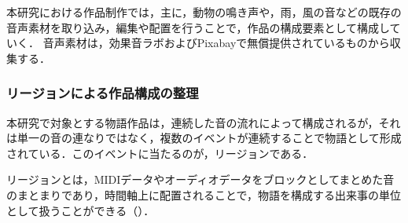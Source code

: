 





本研究における作品制作では，主に，動物の鳴き声や，雨，風の音などの既存の音声素材を取り込み，編集や配置を行うことで，作品の構成要素として構成していく．
音声素材は，効果音ラボ\cite{koukaonlab}およびPixabay\cite{Pixabay}で無償提供されているものから収集する．







\subsubsection{リージョンによる作品構成の整理}
本研究で対象とする物語作品は，連続した音の流れによって構成されるが，それは単一の音の連なりではなく，複数のイベントが連続することで物語として形成されている．このイベントに当たるのが，リージョンである．

リージョンとは，MIDIデータやオーディオデータをブロックとしてまとめた音のまとまりであり，時間軸上に配置されることで，物語を構成する出来事の単位として扱うことができる（）．

